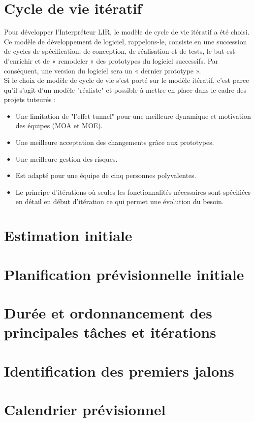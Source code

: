 \documentclass[11pt,a4paper,titlepage,openany]{report}
\begin{document}
    \section{Cycle de vie itératif}
    Pour développer l’Interpréteur LIR, le modèle de cycle de vie itératif a été
    choisi. Ce modèle de développement de logiciel, rappelons-le, consiste en une
    succession de cycles de spécification, de conception, de réalisation et de
    tests, le but est d’enrichir et de « remodeler » des prototypes du logiciel
    successifs. Par conséquent, une version du logiciel sera un « dernier
    prototype ».
    \\Si le choix de modèle de cycle de vie s'est porté sur le modèle itératif,
    c'est parce qu'il s'agit d'un modèle "réaliste" et possible à mettre en place
    dans le cadre des projets tuteurés :

    \begin{itemize}
        \item Une limitation de "l'effet tunnel" pour une meilleure dynamique et motivation des équipes (MOA et MOE).
        \item Une meilleure acceptation des changements grâce aux prototypes.
        \item Une meilleure gestion des risques.
        \item Est adapté pour une équipe de cinq personnes polyvalentes.
        \item Le principe d'itérations où seules les fonctionnalités nécessaires sont spécifiées en détail en début d'itération ce qui permet une évolution du besoin.
    \end{itemize}

    \section{Estimation initiale}
    \section{Planification prévisionnelle initiale}
    \section{Durée et ordonnancement des principales tâches et itérations}
    \section{Identification des premiers jalons}
    \section{Calendrier prévisionnel}
\end{document}
